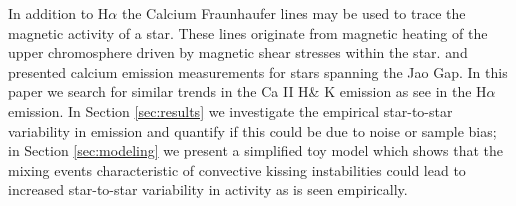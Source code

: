 In addition to H$\alpha$ the Calcium Fraunhaufer lines may be used to trace the
magnetic activity of a star. These lines originate from magnetic heating of the
upper chromosphere driven by magnetic shear stresses within the star.
\citet{Boudreaux2022} and \citet{Perdelwitz2021} presented calcium emission
measurements for stars spanning the Jao Gap. In this paper we search for similar
trends in the Ca II H\& K emission as \citeauthor{Jao2023} see in the H$\alpha$
emission. In Section \ref{sec:results} we investigate the empirical
star-to-star variability in emission and quantify if this could be due to
noise or sample bias; in Section \ref{sec:modeling} we present a simplified toy
model which shows that the mixing events characteristic of convective kissing
instabilities could lead to increased star-to-star variability in activity as
is seen empirically.

%

